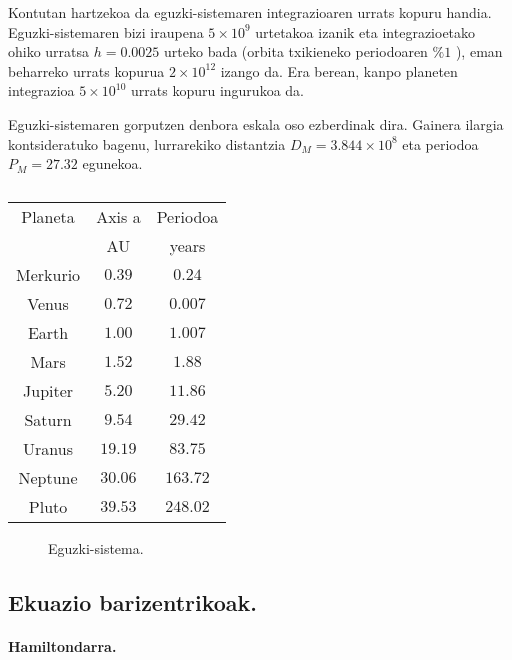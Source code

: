 Kontutan hartzekoa da eguzki-sistemaren integrazioaren urrats kopuru handia. Eguzki-sistemaren bizi iraupena $5  \times 10^9$ urtetakoa izanik eta integrazioetako ohiko urratsa  $h=0.0025$ urteko bada (orbita txikieneko periodoaren $ \%1$ ), eman beharreko urrats kopurua $2 \times 10^{12}$ izango da. Era berean, kanpo planeten integrazioa $5 \times 10^{10}$ urrats kopuru ingurukoa da.     

Eguzki-sistemaren gorputzen denbora eskala oso ezberdinak dira. Gainera ilargia kontsideratuko bagenu, lurrarekiko distantzia $D_M=3.844 \times 10^8$ eta periodoa $P_M=27.32$ egunekoa. 

\begin{table} [h!]
\caption{}
\label{tab:1}       %
\begin{tabular}{c c c} 
\hline
 Planeta   &  Axis a        & Periodoa    \\   
           &   AU          &   years      \\ \hline
 Merkurio  &   $0.39$      &  $0.24$     \\
 Venus     &   $0.72$      &  $0.007$    \\
 Earth     &   $1.00$      &  $1.007$    \\
 Mars      &   $1.52$      &  $1.88$     \\ \hline
 Jupiter   &   $5.20$      &  $11.86$    \\
 Saturn    &   $9.54$      &  $29.42$    \\
 Uranus    &   $19.19$     &  $83.75$    \\
 Neptune   &   $30.06$     &  $163.72$    \\
 Pluto     &   $39.53$     &  $248.02$    \\
\hline
\end{tabular}
\end{table}

\begin{figure}[h]
\centering
{}
\caption{ \small Eguzki-sistema.}
\label{fig:eguzki-sistema}
\end{figure}


\subsection{Ekuazio barizentrikoak.}

\paragraph*{Hamiltondarra.}

